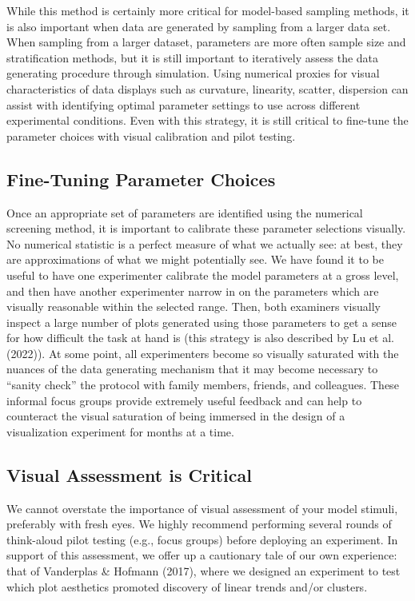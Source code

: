 \documentclass[
  10pt,
]{article}
\begin{document}
While this method is certainly more critical for model-based sampling
methods, it is also important when data are generated by sampling from a
larger data set. When sampling from a larger dataset, parameters are
more often sample size and stratification methods, but it is still
important to iteratively assess the data generating procedure through
simulation. Using numerical proxies for visual characteristics of data
displays such as curvature, linearity, scatter, dispersion can assist
with identifying optimal parameter settings to use across different
experimental conditions. Even with this strategy, it is still critical
to fine-tune the parameter choices with visual calibration and pilot
testing.

\subsection{Fine-Tuning Parameter
Choices}\label{fine-tuning-parameter-choices}

Once an appropriate set of parameters are identified using the numerical
screening method, it is important to calibrate these parameter
selections visually. No numerical statistic is a perfect measure of what
we actually see: at best, they are approximations of what we might
potentially see. We have found it to be useful to have one experimenter
calibrate the model parameters at a gross level, and then have another
experimenter narrow in on the parameters which are visually reasonable
within the selected range. Then, both examiners visually inspect a large
number of plots generated using those parameters to get a sense for how
difficult the task at hand is (this strategy is also described by Lu et
al. (2022)). At some point, all experimenters become so visually
saturated with the nuances of the data generating mechanism that it may
become necessary to ``sanity check'' the protocol with family members,
friends, and colleagues. These informal focus groups provide extremely
useful feedback and can help to counteract the visual saturation of
being immersed in the design of a visualization experiment for months at
a time.

\subsection{Visual Assessment is
Critical}\label{visual-assessment-is-critical}

We cannot overstate the importance of visual assessment of your model
stimuli, preferably with fresh eyes. We highly recommend performing
several rounds of think-aloud pilot testing (e.g., focus groups) before
deploying an experiment. In support of this assessment, we offer up a
cautionary tale of our own experience: that of Vanderplas \& Hofmann
(2017), where we designed an experiment to test which plot aesthetics
promoted discovery of linear trends and/or clusters.
\end{document}
